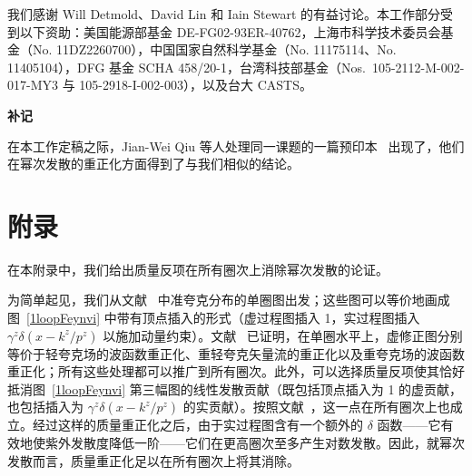 \vspace{1em}
我们感谢 Will Detmold、David Lin 和 Iain Stewart 的有益讨论。本工作部分受到以下资助：美国能源部基金 DE-FG02-93ER-40762，上海市科学技术委员会基金（No. 11DZ2260700），中国国家自然科学基金（No. 11175114、No. 11405104），DFG 基金 SCHA 458/20-1，台湾科技部基金（Nos.\ 105-2112-M-002-017-MY3 与 105-2918-I-002-003），以及台大 CASTS。

\vspace{2em}
\begin{center}
\bf{补记}
\end{center}

在本工作定稿之际，Jian-Wei Qiu 等人处理同一课题的一篇预印本~\cite{Ishikawa:2016znu} 出现了，他们在幂次发散的重正化方面得到了与我们相似的结论。

\appendix

\section{附录}

在本附录中，我们给出质量反项在所有圈次上消除幂次发散的论证。

为简单起见，我们从文献~\cite{Ji:2015jwa} 中准夸克分布的单圈图出发；这些图可以等价地画成图~\ref{1loopFeynvi} 中带有顶点插入的形式（虚过程图插入 1，实过程图插入 $\gamma^z\delta(x-k^z/p^z)$ 以施加动量约束）。文献~\cite{Ji:2015jwa} 已证明，在单圈水平上，虚修正图分别等价于轻夸克场的波函数重正化、重轻夸克矢量流的重正化以及重夸克场的波函数重正化；所有这些处理都可以推广到所有圈次。此外，可以选择质量反项使其恰好抵消图~\ref{1loopFeynvi} 第三幅图的线性发散贡献（既包括顶点插入为 1 的虚贡献，也包括插入为 $\gamma^z\delta(x-k^z/p^z)$ 的实贡献）。按照文献~\cite{Dorn:1986dt}，这一点在所有圈次上也成立。经过这样的质量重正化之后，由于实过程图含有一个额外的 $\delta$ 函数——它有效地使紫外发散度降低一阶——它们在更高圈次至多产生对数发散。因此，就幂次发散而言，质量重正化足以在所有圈次上将其消除。

